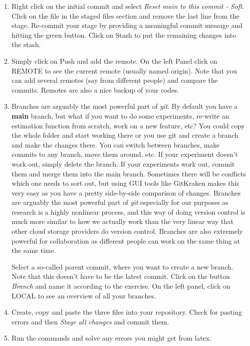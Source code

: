 \begin{enumerate}
\item
Right click on the initial commit and select \emph{Reset main to this commit {-} Soft}.
Click on the file in the staged files section and remove the last line from the stage.
Re-commit your stage by providing a meaningful commit message and hitting the green button.
Click on Stash to put the remaining changes into the stash.

\item
Simply click on Push and add the remote.
On the left Panel click on REMOTE to see the current remote (usually named origin).
Note that you can add several remotes (say from different people) and compare the commits.
Remotes are also a nice backup of your codes.

\item
Branches are arguably the most powerful part of \emph{git}.
By default you have a \textbf{main} branch,
  but what if you want to do some experiments, re-write an estimation function from scratch, work on a new feature, etc?
You could copy the whole folder and start working there or you use git and create a branch and make the changes there.
You can switch between branches, make commits to any branch, move them around, etc.
If your experiment doesn't work out, simply delete the branch.
If your experiments work out, commit them and merge them into the main branch.
Sometimes there will be conflicts which one needs to sort out,
  but using GUI tools like GitKraken makes this very easy
  as you have a pretty side-by-side comparison of changes.
Branches are arguably the most powerful part of \emph{git} especially for our purposes
  as research is a highly nonlinear process, and this way of doing version control is much more similar to how we actually work
  than the very linear way that other cloud storage providers do version control.
Branches are also extremely powerful for collaboration
  as different people can work on the same thing at the same time.

Select a so-called parent commit, where you want to create a new branch.
Note that this doesn't have to be the latest commit.
Click on the button \emph{Branch} and name it according to the exercise.
On the left panel, click on LOCAL to see an overview of all your branches.

\item
Create, copy and paste the three files into your repository.
Check for pasting errors and then \emph{Stage all changes} and commit them.

\item
Run the commands and solve any errors you might get from latex.


\end{enumerate}
